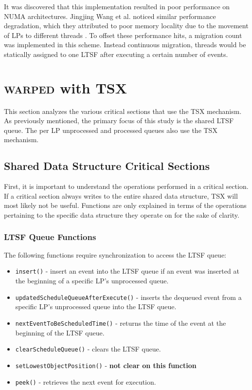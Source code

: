 \documentclass[11pt]{book}
\begin{document}
It was discovered that this implementation resulted in poor performance on NUMA
architectures.  Jingjing Wang et al. noticed similar performance degradation, which they
attributed to poor memory locality due to the movement of LPs to different threads
\cite{numa}.  To offset these performance hits, a migration count was implemented in this
scheme.  Instead continuous migration, threads would be statically assigned to one LTSF
after executing a certain number of events.


\chapter{\textsc{warped} with TSX}

This section analyzes the various critical sections that use the TSX mechanism.
As previously mentioned, the primary focus of this study is the shared LTSF
queue.  The per LP unprocessed and processed queues also use the TSX mechanism.

\section{Shared Data Structure Critical Sections}

First, it is important to understand the operations performed in a critical
section.  If a critical section always writes to the entire shared data
structure, TSX will most likely not be useful.  Functions are only explained in
terms of the operations pertaining to the specific data structure they operate
on for the sake of clarity.  

\subsection{LTSF Queue Functions}

The following functions require synchronization to access the LTSF
queue:

\begin{itemize}
  \item\texttt{insert()} - insert an event into the LTSF queue if an event was inserted at
    the beginning of a specific LP's unprocessed queue.
  \item\texttt{updatedScheduleQueueAfterExecute()} - inserts the dequeued event from a
    specific LP's unprocessed queue into the LTSF queue.
  \item\texttt{nextEventToBeScheduledTime()} - returns the time of the event at the
    beginning of the LTSF queue.
  \item\texttt{clearScheduleQueue()} - clears the LTSF queue.
  \item\texttt{setLowestObjectPosition()} - \textbf{not clear on this function}
  \item\texttt{peek()} - retrieves the next event for execution.
\end{itemize}
\end{document}
